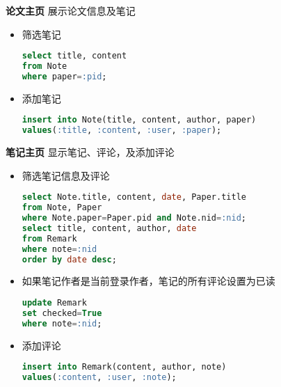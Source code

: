 \noindent
{\bf 论文主页} 展示论文信息及笔记
\begin{itemize}
\item 筛选笔记
\begin{lstlisting}[language=SQL]
select title, content
from Note
where paper=:pid;
\end{lstlisting}
\item 添加笔记
\begin{lstlisting}[language=SQL]
insert into Note(title, content, author, paper)
values(:title, :content, :user, :paper);
\end{lstlisting}
\end{itemize}
{\bf 笔记主页} 显示笔记、评论，及添加评论
\begin{itemize}
\item 筛选笔记信息及评论
\begin{lstlisting}[language=SQL]
select Note.title, content, date, Paper.title
from Note, Paper
where Note.paper=Paper.pid and Note.nid=:nid;
select title, content, author, date
from Remark
where note=:nid
order by date desc;
\end{lstlisting}
\item 如果笔记作者是当前登录作者，笔记的所有评论设置为已读
\begin{lstlisting}[language=SQL]
update Remark
set checked=True
where note=:nid;
\end{lstlisting}
\item 添加评论
\begin{lstlisting}[language=SQL]
insert into Remark(content, author, note)
values(:content, :user, :note);
\end{lstlisting}
\end{itemize}